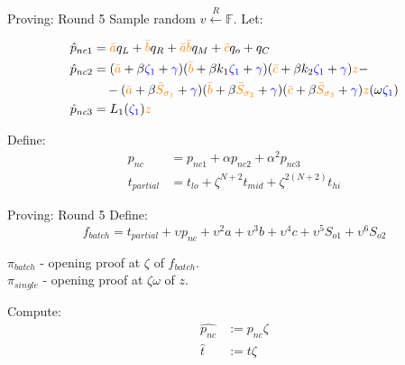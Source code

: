 \documentclass{zkdl-presentation-template}
\begin{document}
    \begin{frame} {Proving: Round 5}
        Sample random $v \xleftarrow{R}\mathbb{F}$. Let:

        \begin{align*}
            \hat{p}_{nc1} &= \textcolor{orange}{\bar{a}}q_L + \textcolor{orange}{\bar{b}}q_R + \textcolor{orange}{\bar{a}}\textcolor{orange}{\bar{b}}q_M + \textcolor{orange}{\bar{c}}q_o + q_C \\
            \hat{p}_{nc2} &= (\textcolor{orange}{\bar{a}} + \beta \textcolor{blue}{\zeta_1} + \textcolor{blue}{\gamma})(\textcolor{orange}{\bar{b}} + \beta k_1 \textcolor{blue}{\zeta_1} + \textcolor{blue}{\gamma})(\textcolor{orange}{\bar{c}} + \beta k_2 \textcolor{blue}{\zeta_1} + \textcolor{blue}{\gamma}) \textcolor{orange}{z} - \\
            &\quad - (\textcolor{orange}{\bar{a}} + \beta \textcolor{orange}{\bar{S}_{\sigma_1}} + \textcolor{blue}{\gamma})(\textcolor{orange}{\bar{b}} + \beta \textcolor{orange}{\bar{S}_{\sigma_2}} + \textcolor{blue}{\gamma})(\textcolor{orange}{\bar{c}} + \beta \textcolor{orange}{\bar{S}_{\sigma_3}} + \textcolor{blue}{\gamma}) \textcolor{orange}{z}(\omega \textcolor{blue}{\zeta_1}) \\
            \hat{p}_{nc3} &= L_1(\textcolor{blue}{\zeta_1})\textcolor{orange}{z}
        \end{align*}
     
        Define:
        \begin{align*}
            p_{nc} &= p_{nc1} + \alpha p_{nc2} + \alpha^2 p_{nc3} \\
            t_{partial} &= t_{lo} + \zeta^{N+2}t_{mid} + \zeta^{2(N+2)}t_{hi}
        \end{align*}
    \end{frame}

    \begin{frame} {Proving: Round 5}
        Define:
        \begin{equation*}
            f_{batch} = t_{partial} + \upsilon p_{nc} + \upsilon^2 a + \upsilon^3 b + \upsilon^4 c + \upsilon^5 S_{o1} + \upsilon^6 S_{o2}
        \end{equation*}

        \begin{definition}
            $\pi_{batch}$ - opening proof at $\zeta$ of $f_{batch}$. \\
            $\pi_{single}$ - opening proof at $\zeta\omega$ of $z$.
        \end{definition}

        Compute:
        \begin{align*}
            \hat{p_{nc}} &:= p_{nc}{\zeta} \\
            \hat{t} &:= t{\zeta}
        \end{align*}
    \end{frame}
\end{document}
